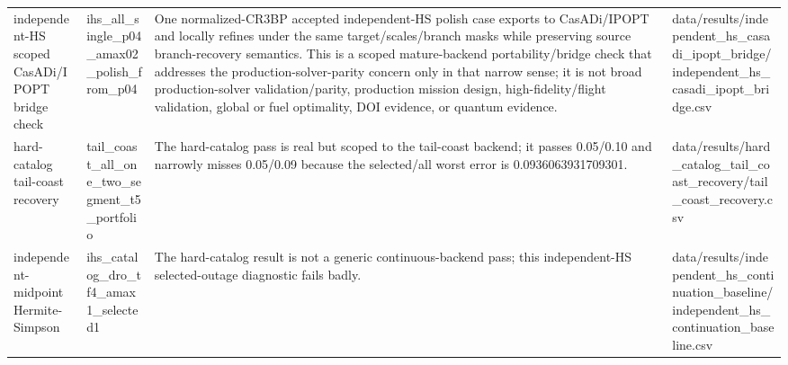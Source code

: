 \begin{tabular}{llll}
independent-HS scoped CasADi/IPOPT bridge check & ihs\_all\_single\_p04\_amax02\_polish\_from\_p04 & One normalized-CR3BP accepted independent-HS polish case exports to CasADi/IPOPT and locally refines under the same target/scales/branch masks while preserving source branch-recovery semantics. This is a scoped mature-backend portability/bridge check that addresses the production-solver-parity concern only in that narrow sense; it is not broad production-solver validation/parity, production mission design, high-fidelity/flight validation, global or fuel optimality, DOI evidence, or quantum evidence. & data/results/independent\_hs\_casadi\_ipopt\_bridge/independent\_hs\_casadi\_ipopt\_bridge.csv \\
hard-catalog tail-coast recovery & tail\_coast\_all\_one\_two\_segment\_t5\_portfolio & The hard-catalog pass is real but scoped to the tail-coast backend; it passes 0.05/0.10 and narrowly misses 0.05/0.09 because the selected/all worst error is 0.0936063931709301. & data/results/hard\_catalog\_tail\_coast\_recovery/tail\_coast\_recovery.csv \\
independent-midpoint Hermite-Simpson & ihs\_catalog\_dro\_tf4\_amax1\_selected1 & The hard-catalog result is not a generic continuous-backend pass; this independent-HS selected-outage diagnostic fails badly. & data/results/independent\_hs\_continuation\_baseline/independent\_hs\_continuation\_baseline.csv \\
\bottomrule
\end{tabular}
